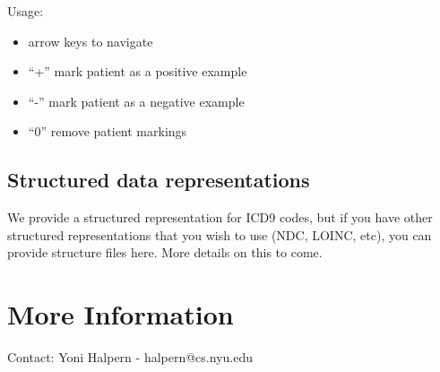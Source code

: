 \documentclass[12pt]{article}
\begin{document}
Usage:
\begin{itemize}
\item arrow keys to navigate
\item ``+'' mark patient as a positive example
\item ``-'' mark patient as a negative example
\item ``0'' remove patient markings
\end{itemize}

\subsection{Structured data representations}
We provide a structured representation for ICD9 codes, but if you have other structured representations that you wish to use (NDC, LOINC, etc), you can provide structure files here. More details on this to come.


\section{More Information}
Contact: Yoni Halpern - halpern@cs.nyu.edu
\end{document}
